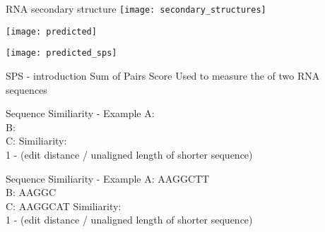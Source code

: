

\begin{frame}[c]{RNA secondary structure}
    \center
    \texttt{[image: secondary\_structures]}
\end{frame}


\begin{frame}[c]{}
    \center
    \texttt{[image: predicted]}
\end{frame}


\begin{frame}[c]{}
    \center
    \texttt{[image: predicted\_sps]}
\end{frame}


\begin{frame}[c]{SPS - introduction}
    Sum of Pairs Score
    \newline
    \newline
    \pause
    Used to measure the  of two RNA sequences
\end{frame}


\begin{frame}[c]{Sequence Similiarity - Example}
    A: \only<4-5>{AAGGC} \\
    B:  \\
    C:  \newline
    \newline
    Similiarity:  \\
    1 - (edit distance / unaligned length of shorter sequence)
\end{frame}


\begin{frame}[c]{Sequence Similiarity - Example}
    A: {\color{ForestGreen}AAGGC}{\color{red}T}{\color{ForestGreen}T} \\
    B: AAGGC \\
    C: {\color{ForestGreen}AAGGC}{\color{red}A}{\color{ForestGreen}T} \newline
    \newline
    Similiarity:  \\
    1 - (edit distance / unaligned length of shorter sequence)
\end{frame}



